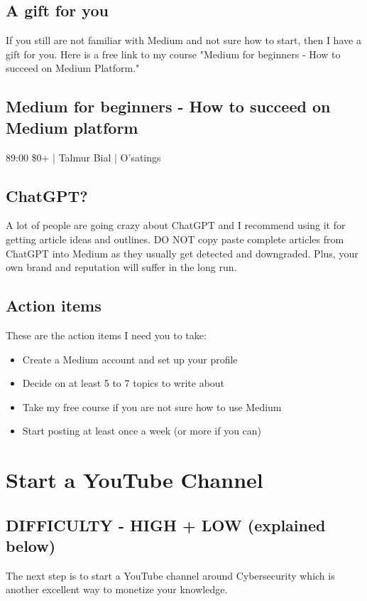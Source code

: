 \documentclass[11pt]{article}
\begin{document}
\subsection*{A gift for you}
If you still are not familiar with Medium and not sure how to start, then I have a gift for you. Here is a free link to my course "Medium for beginners - How to succeed on Medium Platform."

\subsection*{Medium for beginners - How to succeed on Medium platform}
\begin{center}
89:00 \$0+ | Talmur Bial | O'satings
\end{center}

\subsection*{ChatGPT?}
A lot of people are going crazy about ChatGPT and I recommend using it for getting article ideas and outlines. DO NOT copy paste complete articles from ChatGPT into Medium as they usually get detected and downgraded. Plus, your own brand and reputation will suffer in the long run.

\subsection*{Action items}
These are the action items I need you to take:

\begin{itemize}
\item Create a Medium account and set up your profile
\item Decide on at least 5 to 7 topics to write about
\item Take my free course if you are not sure how to use Medium
\item Start posting at least once a week (or more if you can)
\end{itemize}

\section*{Start a YouTube Channel}
\subsection*{DIFFICULTY - HIGH + LOW (explained below)}
The next step is to start a YouTube channel around Cybersecurity which is another excellent way to monetize your knowledge.
\end{document}

